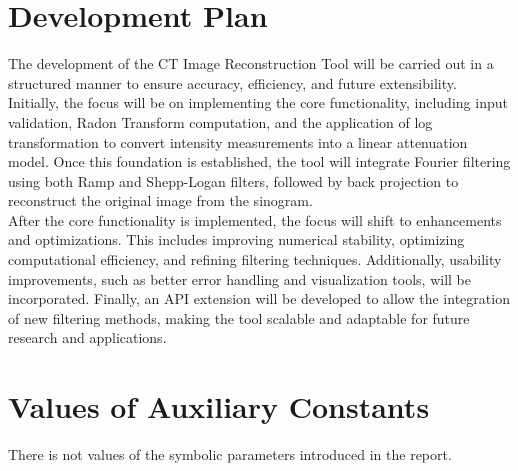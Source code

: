 \documentclass[12pt]{article}
\begin{document}

\section{Development Plan}
The development of the CT Image Reconstruction Tool will be carried out in a
structured manner to ensure accuracy, efficiency, and future extensibility.
Initially, the focus will be on implementing the core functionality, including
input validation, Radon Transform computation, and the application of log
transformation to convert intensity measurements into a linear attenuation
model. Once this foundation is established, the tool will integrate Fourier
filtering using both Ramp and Shepp-Logan filters, followed by back projection
to reconstruct the original image from the sinogram.\\

After the core functionality is implemented, the focus will shift to
enhancements and optimizations. This includes improving numerical stability,
optimizing computational efficiency, and refining filtering techniques.
Additionally, usability improvements, such as better error handling and
visualization tools, will be incorporated. Finally, an API extension will be
developed to allow the integration of new filtering methods, making the tool
scalable and adaptable for future research and applications.

\section{Values of Auxiliary Constants}
There is not values of the symbolic parameters introduced in the report.

\newpage
\printbibliography
\end{document}
